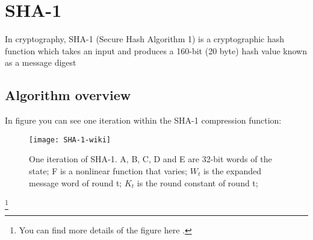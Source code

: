 \section{SHA-1} \label{sec:SHA-1}

In cryptography, SHA-1 (Secure Hash Algorithm 1) is a cryptographic hash function which takes an input and produces a 160-bit (20 byte) hash value known as a message digest
\subsection{Algorithm overview}

In figure you can see one iteration within the SHA-1 compression function:
\begin{figure}[!h]
\centering\texttt{[image: SHA-1-wiki]}
\caption{One iteration of SHA-1.
A, B, C, D and E are 32-bit words of the state; F is a nonlinear function that varies; $W_t$ is the expanded message word of round t; $K_t$ is the round constant of round t;}
\label{fig:SHA-1-wiki} 
\end{figure}
\footnote{You can find more details of the figure here \cite{sha-1-wiki}.}

